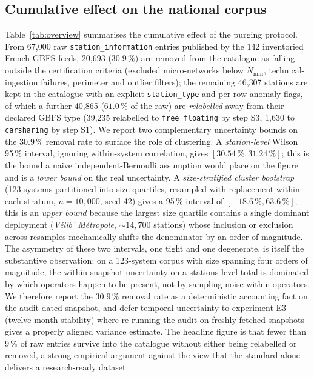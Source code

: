 \documentclass[11pt,a4paper]{article}
\begin{document}
\subsection{Cumulative effect on the national corpus}
Table~\ref{tab:overview} summarises the cumulative effect of the
purging protocol. From 67{,}000 raw \texttt{station\_information}
entries published by the 142 inventoried French GBFS feeds,
20{,}693 ($30.9\,\%$) are removed from the catalogue as falling
outside the certification criteria (excluded micro-networks below
$N_{\min}$, technical-ingestion failures, perimeter and outlier
filters); the remaining 46{,}307 stations are kept in the catalogue
with an explicit \texttt{station\_type} and per-row anomaly flags,
of which a further 40{,}865 ($61.0\,\%$ of the raw) are
\emph{relabelled} away from their declared GBFS type (39{,}235
relabelled to \texttt{free\_floating} by step S3, 1{,}630 to
\texttt{carsharing} by step S1). We report two complementary uncertainty bounds on the
$30.9\,\%$ removal rate to surface the role of clustering. A
\emph{station-level} Wilson 95\,\% interval, ignoring within-system
correlation, gives $[30.54\,\%, 31.24\,\%]$; this is the bound a
naive independent-Bernoulli assumption would place on the figure
and is a \emph{lower bound} on the real uncertainty. A
\emph{size-stratified cluster bootstrap} (123 systems partitioned
into size quartiles, resampled with replacement within each
stratum, $n = 10{,}000$, seed 42) gives a 95\,\% interval of
$[-18.6\,\%, 63.6\,\%]$; this is an \emph{upper bound} because
the largest size quartile contains a single dominant deployment
(\emph{V\'elib' M\'etropole}, $\sim 14{,}700$ stations) whose
inclusion or exclusion across resamples mechanically shifts the
denominator by an order of magnitude. The asymmetry of these two
intervals, one tight and one degenerate, is itself the
substantive observation: on a 123-system corpus with size
spanning four orders of magnitude, the within-snapshot
uncertainty on a stations-level total is dominated by which
operators happen to be present, not by sampling noise within
operators. We therefore report the $30.9\,\%$ removal rate as a
deterministic accounting fact on the audit-dated snapshot, and
defer temporal uncertainty to experiment E3 (twelve-month
stability) where re-running the audit on freshly fetched
snapshots gives a properly aligned variance estimate. The
headline figure is that fewer than $9\,\%$ of raw entries
survive into the catalogue without either being relabelled or
removed, a strong empirical argument against the view that the
standard alone delivers a research-ready dataset.
\end{document}
